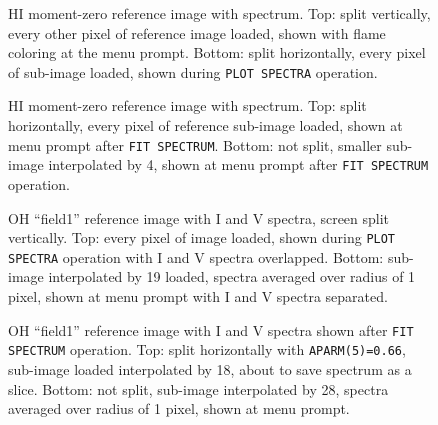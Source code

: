 \documentclass[twoside]{article}
\newcommand{\putfig}[1]{\texttt{[image: \#1]}}
\begin{document}
\begin{figure}
\begin{center}
\resizebox{6.03in}{!}{\putfig{TVSPCHIa.eps}}
\centerline{\hphantom{MM}}
\resizebox{6.03in}{!}{\putfig{TVSPCHIb.eps}}
\caption{HI moment-zero reference image with spectrum.  Top: split
  vertically, every other pixel of reference image loaded, shown with
  flame coloring at the menu prompt.  Bottom: split horizontally,
  every pixel of sub-image loaded, shown during {\tt PLOT SPECTRA}
  operation.}
\label{fig:HIab}
\end{center}
\end{figure}

\begin{figure}
\begin{center}
\resizebox{6.03in}{!}{\putfig{TVSPCHIc.eps}}
\centerline{\hphantom{MM}}
\resizebox{6.03in}{!}{\putfig{TVSPCHId.eps}}
\caption{HI moment-zero reference image with spectrum.  Top: split
  horizontally, every pixel of reference sub-image loaded, shown at
  menu prompt after {\tt FIT SPECTRUM}\@.  Bottom: not split, smaller
  sub-image interpolated by 4, shown at menu prompt after {\tt FIT
    SPECTRUM} operation.}
\label{fig:HIcd}
\end{center}
\end{figure}

\begin{figure}
\begin{center}
\resizebox{6.03in}{!}{\putfig{TVSPCOHa.eps}}
\centerline{\hphantom{MM}}
\resizebox{6.03in}{!}{\putfig{TVSPCOHb.eps}}
\caption{OH ``field1'' reference image with I and V spectra, screen
  split vertically.  Top: every pixel of image loaded, shown during
  {\tt PLOT SPECTRA} operation with I and V spectra overlapped.
  Bottom: sub-image interpolated by 19 loaded, spectra averaged over
  radius of 1 pixel, shown at menu prompt with I and V spectra
  separated.}
\label{fig:OHab}
\end{center}
\end{figure}

\begin{figure}
\begin{center}
\resizebox{6.03in}{!}{\putfig{TVSPCOHc.eps}}
\centerline{\hphantom{MM}}
\resizebox{6.03in}{!}{\putfig{TVSPCOHd.eps}}
\caption{OH ``field1'' reference image with I and V spectra shown
  after {\tt FIT SPECTRUM} operation.  Top: split horizontally with
  {\tt APARM(5)=0.66}, sub-image loaded interpolated by 18, about to
  save spectrum as a slice.  Bottom: not split, sub-image interpolated
  by 28, spectra averaged over radius of 1 pixel, shown at menu
  prompt.}
\label{fig:OHcd}
\end{center}
\end{figure}
\end{document}

